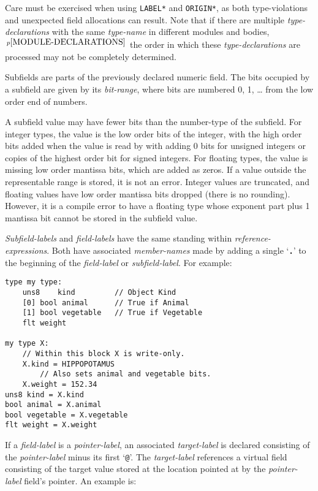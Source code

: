 \documentclass[12pt]{article}
\newcommand{\TT}[1]{{\tt \bfseries #1}}
\newcommand{\pagnote}[1]{$\,^{p\pageref{#1}}$}
\newenvironment{indpar}[1][0.3in]%
	{\begin{list}{}%
		     {\setlength{\itemsep}{0in}%
		      \setlength{\topsep}{0in}%
		      \setlength{\parsep}{1ex}%
		      \setlength{\labelwidth}{#1}%
		      \setlength{\leftmargin}{#1}%
		      \addtolength{\leftmargin}{\labelsep}}%
	 \item}%
	{\end{list}}
\begin{document}
Care must be exercised when using {\tt *LABEL*} and {\tt *ORIGIN*},
as both type-violations and unexpected field allocations can result.
Note that if there are multiple {\em type-declarations}
with the same {\em type-name} in different
modules and bodies,\pagnote{MODULE-DECLARATIONS}
the order in which these {\em type-declarations} are processed
may not be completely determined.

Subfields are parts of the previously declared numeric field.
The bits occupied
by a subfield are given by its {\em bit-range}, where bits are numbered
0, 1, \ldots{} from the low order end of numbers.

A subfield value may have fewer bits than the number-type of the subfield.
For integer types, the value is the low order bits of the integer, with
the high order bits added when the value is read by with adding 0 bits
for unsigned integers or copies of the highest order bit for signed integers.
For floating types, the value is missing low order mantissa bits, which
are added as zeros.  If a value outside the representable range is stored,
it is not an error.  Integer values are truncated, and floating values
have low order mantissa bits dropped (there is no rounding).  However, it is
a compile error to have a floating type whose exponent part plus
1 mantissa bit cannot be stored in the subfield value.

{\em Subfield-labels} and {\em field-labels} have the same standing within
{\em reference-expressions}.
Both have associated {\em member-names} made by adding a single
`\TT{.}' to the beginning of the {\em field-label} or {\em subfield-label}.
For example:

\begin{indpar}\begin{verbatim}
type my type:
    uns8    kind         // Object Kind
    [0] bool animal      // True if Animal
    [1] bool vegetable   // True if Vegetable
    flt weight

my type X:
    // Within this block X is write-only.
    X.kind = HIPPOPOTAMUS
        // Also sets animal and vegetable bits.
    X.weight = 152.34
uns8 kind = X.kind
bool animal = X.animal
bool vegetable = X.vegetable
flt weight = X.weight
\end{verbatim}\end{indpar}

If a {\em field-label} is a {\em pointer-label}, an
associated {\em target-label} is declared consisting of the
{\em pointer-label} minus its first `{\tt @}'.  The {\em target-label}
references a virtual field consisting of the target value stored
at the location pointed at by the {\em pointer-label} field's pointer.
An example is:
\end{document}
